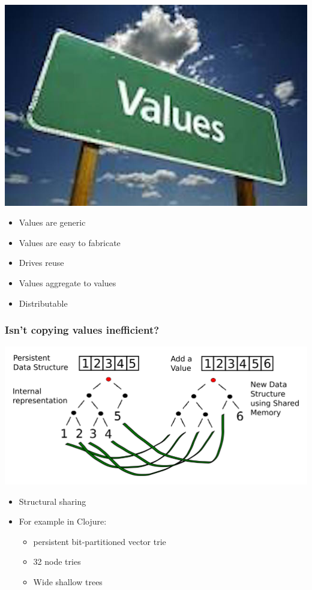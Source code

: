 \documentclass[11pt]{article}
\begin{document}
\includegraphics[width=.9\linewidth]{./values.jpeg}
\begin{itemize}
\item Values are generic
\item Values are easy to fabricate
\item Drives reuse
\item Values aggregate to values
\item Distributable
\end{itemize}

\subsubsection*{Isn't copying values inefficient?}
\label{sec:orgheadline18}

\includegraphics[width=.9\linewidth]{./clojure-persistent-data-structures-sharing.png}

\begin{itemize}
\item Structural sharing
\item For example in Clojure:
\begin{itemize}
\item persistent bit-partitioned vector trie
\item 32 node tries
\item Wide shallow trees
\end{itemize}
\end{itemize}
\end{document}
